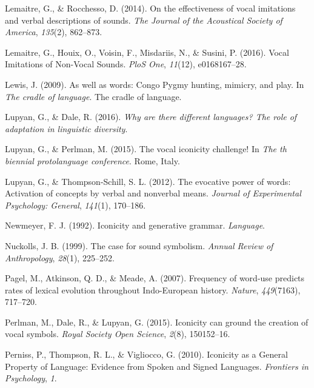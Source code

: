\documentclass[english,floatsintext,man]{apa6}
\theoremstyle{definition}
\theoremstyle{definition}
\theoremstyle{definition}
\theoremstyle{remark}
\begin{document}
\leavevmode\hypertarget{ref-Lemaitre:2014kr}{}%
Lemaitre, G., \& Rocchesso, D. (2014). On the effectiveness of vocal
imitations and verbal descriptions of sounds. \emph{The Journal of the
Acoustical Society of America}, \emph{135}(2), 862--873.

\leavevmode\hypertarget{ref-Lemaitre:2016kz}{}%
Lemaitre, G., Houix, O., Voisin, F., Misdariis, N., \& Susini, P.
(2016). Vocal Imitations of Non-Vocal Sounds. \emph{PloS One},
\emph{11}(12), e0168167--28.

\leavevmode\hypertarget{ref-Lewis:2009wz}{}%
Lewis, J. (2009). As well as words: Congo Pygmy hunting, mimicry, and
play. In \emph{The cradle of language}. The cradle of language.

\leavevmode\hypertarget{ref-Lupyan:2016uw}{}%
Lupyan, G., \& Dale, R. (2016). \emph{Why are there different languages?
The role of adaptation in linguistic diversity}.

\leavevmode\hypertarget{ref-Lupyan:2015vic}{}%
Lupyan, G., \& Perlman, M. (2015). The vocal iconicity challenge! In
\emph{The th biennial protolanguage conference}. Rome, Italy.

\leavevmode\hypertarget{ref-Lupyan:2012cp}{}%
Lupyan, G., \& Thompson-Schill, S. L. (2012). The evocative power of
words: Activation of concepts by verbal and nonverbal means.
\emph{Journal of Experimental Psychology: General}, \emph{141}(1),
170--186.

\leavevmode\hypertarget{ref-Newmeyer:1992we}{}%
Newmeyer, F. J. (1992). Iconicity and generative grammar.
\emph{Language}.

\leavevmode\hypertarget{ref-Nuckolls:1999ca}{}%
Nuckolls, J. B. (1999). The case for sound symbolism. \emph{Annual
Review of Anthropology}, \emph{28}(1), 225--252.

\leavevmode\hypertarget{ref-Pagel:2007br}{}%
Pagel, M., Atkinson, Q. D., \& Meade, A. (2007). Frequency of word-use
predicts rates of lexical evolution throughout Indo-European history.
\emph{Nature}, \emph{449}(7163), 717--720.

\leavevmode\hypertarget{ref-Perlman:2015ip}{}%
Perlman, M., Dale, R., \& Lupyan, G. (2015). Iconicity can ground the
creation of vocal symbols. \emph{Royal Society Open Science},
\emph{2}(8), 150152--16.

\leavevmode\hypertarget{ref-Perniss:2010fb}{}%
Perniss, P., Thompson, R. L., \& Vigliocco, G. (2010). Iconicity as a
General Property of Language: Evidence from Spoken and Signed Languages.
\emph{Frontiers in Psychology}, \emph{1}.
\end{document}
